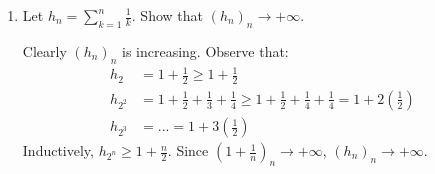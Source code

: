 \begin{enumerate}[label = (\arabic*)]
        \item Let $h_n = \sum_{k = 1}^n \frac{1}{k}$. Show that $(h_n)_n \rightarrow +\infty$.
            {\color{red} \begin{solution}
                Clearly $(h_n)_n$ is increasing. Observe that:
                    \begin{equation*}
                    \begin{split}
                        h_2 &= 1 + \frac{1}{2} \geq 1 + \frac{1}{2} \\
                        h_{2^2} &= 1 + \frac{1}{2} + \frac{1}{3} + \frac{1}{4} \geq 1 + \frac{1}{2} + \frac{1}{4} + \frac{1}{4} = 1 + 2 \left(\frac{1}{2}\right) \\
                        h_{2^3} & = ... = 1 + 3 \left(\frac{1}{2}\right)
                    \end{split}
                    \end{equation*}
                Inductively, $h_{2^n} \geq 1 + \frac{n}{2}$. Since $(1 + \frac{1}{n})_n \rightarrow +\infty$, $(h_n)_n \rightarrow +\infty$.
            \end{solution}}
   \end{enumerate}

